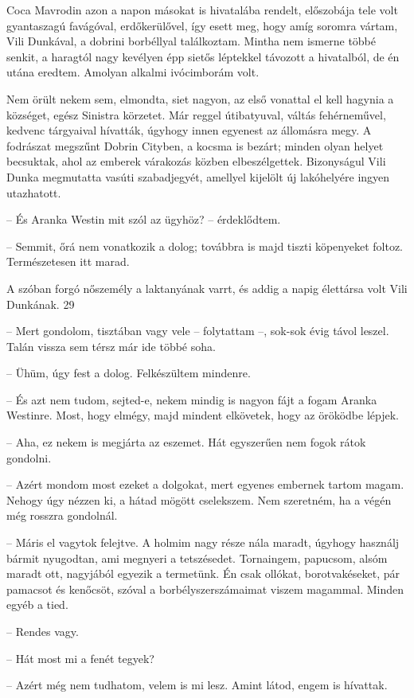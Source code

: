 \documentclass{IEEEtran}
\begin{document}
Coca Mavrodin azon a napon másokat is hivatalába rendelt, előszobája tele volt
gyantaszagú favágóval, erdőkerülővel, így esett meg, hogy amíg soromra vártam,
Vili Dunkával, a dobrini borbéllyal találkoztam. Mintha nem ismerne többé
senkit, a haragtól nagy kevélyen épp sietős léptekkel távozott a hivatalból,
de én utána eredtem. Amolyan alkalmi ivócimborám volt.

Nem örült nekem sem, elmondta, siet nagyon, az első vonattal el kell hagynia a
községet, egész Sinistra körzetet. Már reggel útibatyuval, váltás
fehérneművel, kedvenc tárgyaival hívatták, úgyhogy innen egyenest az állomásra
megy. A fodrászat megszűnt Dobrin Cityben, a kocsma is bezárt; minden olyan
helyet becsuktak, ahol az emberek várakozás közben elbeszélgettek. Bizonyságul
Vili Dunka megmutatta vasúti szabadjegyét, amellyel kijelölt új lakóhelyére
ingyen utazhatott.

– És Aranka Westin mit szól az ügyhöz? – érdeklődtem.

– Semmit, őrá nem vonatkozik a dolog; továbbra is majd tiszti köpenyeket
foltoz. Természetesen itt marad.

A szóban forgó nőszemély a laktanyának varrt, és addig a napig élettársa volt
Vili Dunkának.
29

– Mert gondolom, tisztában vagy vele – folytattam –, sok-sok évig távol
leszel. Talán vissza sem térsz már ide többé soha.

– Ühüm, úgy fest a dolog. Felkészültem mindenre.

– És azt nem tudom, sejted-e, nekem mindig is nagyon fájt a fogam Aranka
Westinre. Most, hogy elmégy, majd mindent elkövetek, hogy az öröködbe lépjek.

– Aha, ez nekem is megjárta az eszemet. Hát egyszerűen nem fogok rátok
gondolni.

– Azért mondom most ezeket a dolgokat, mert egyenes embernek tartom magam.
Nehogy úgy nézzen ki, a hátad mögött cselekszem. Nem szeretném, ha a végén még
rosszra gondolnál.

– Máris el vagytok felejtve. A holmim nagy része nála maradt, úgyhogy használj
bármit nyugodtan, ami megnyeri a tetszésedet. Tornaingem, papucsom, alsóm
maradt ott, nagyjából egyezik a termetünk. Én csak ollókat, borotvakéseket,
pár pamacsot és kenőcsöt, szóval a borbélyszerszámaimat viszem magammal.
Minden egyéb a tied.

– Rendes vagy.

– Hát most mi a fenét tegyek?

– Azért még nem tudhatom, velem is mi lesz. Amint látod, engem is hívattak.
\end{document}
